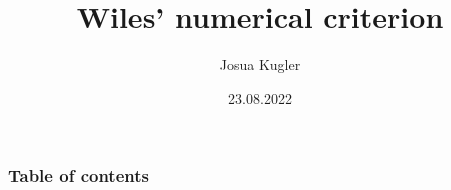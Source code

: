 \documentclass{beamer}
\title{Wiles' numerical criterion}
\author{Josua Kugler}
\date{23.08.2022}
\theoremstyle{plain}%
\theoremstyle{definition}
\theoremstyle{remark}
\begin{document}
\frame{\titlepage}
\begin{frame}
    \frametitle{Table of contents}
    \tableofcontents
\end{frame}
\end{document}
